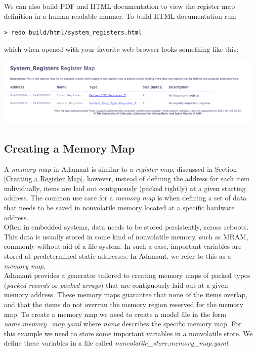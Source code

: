 We can also build PDF and HTML documentation to view the register map definition in a human readable manner. To build HTML documentation run:

\vspace{5mm} %
\begin{verbatim}
> redo build/html/system_registers.html
\end{verbatim}
\vspace{5mm} %

which when opened with your favorite web browser looks something like this:

\vspace{5mm} %
\includegraphics[width=\textwidth]{images/registermaphtml.png}
\vspace{5mm} %

\subsection{Creating a Memory Map} \label{Creating a Memory Map}

A \textit{memory map} in Adamant is similar to a \textit{register map}, discussed in Section \ref{Creating a Register Map}, however, instead of defining the address for each item individually, items are laid out contiguously (packed tightly) at a given starting address. The common use case for a \textit{memory map} is when defining a set of data that needs to be saved in nonvolatile memory located at a specific hardware address. \\

Often in embedded systems, data needs to be stored persistently, across reboots. This data is usually stored in some kind of nonvolatile memory, such as MRAM, commonly without aid of a file system. In such a case, important variables are stored at predetermined static addresses. In Adamant, we refer to this as a \textit{memory map}. \\

Adamant provides a generator tailored to creating memory maps of packed types (\textit{packed records} or \textit{packed arrays}) that are contiguously laid out at a given memory address. These memory maps guarantee that none of the items overlap, and that the items do not overrun the memory region reserved for the memory map. To create a memory map we need to create a model file in the form \textit{name.memory\_map.yaml} where \textit{name} describes the specific memory map. For this example we need to store some important variables in a nonvolatile store. We define these variables in a file called \textit{nonvolatile\_store.memory\_map.yaml}: \\

